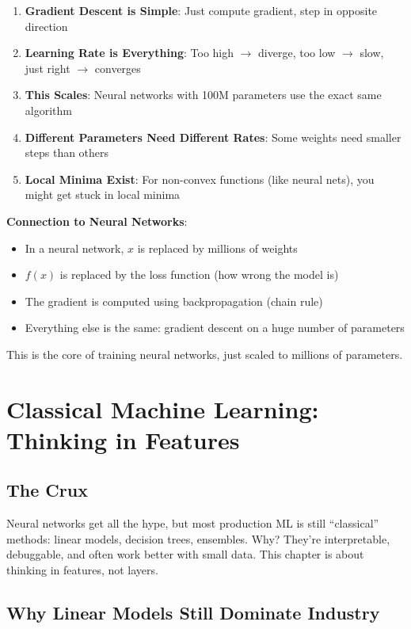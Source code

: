 \documentclass[11pt,oneside]{book}
\newcommand{\blankpage}{%
    \clearpage
    \thispagestyle{empty}
    \mbox{}
    \clearpage
}
\begin{document}
\begin{enumerate}
\item \textbf{Gradient Descent is Simple}: Just compute gradient, step in opposite direction
\item \textbf{Learning Rate is Everything}: Too high $\rightarrow$ diverge, too low $\rightarrow$ slow, just right $\rightarrow$ converges
\item \textbf{This Scales}: Neural networks with 100M parameters use the exact same algorithm
\item \textbf{Different Parameters Need Different Rates}: Some weights need smaller steps than others
\item \textbf{Local Minima Exist}: For non-convex functions (like neural nets), you might get stuck in local minima
\end{enumerate}

\textbf{Connection to Neural Networks}:
\begin{itemize}
\item In a neural network, $x$ is replaced by millions of weights
\item $f(x)$ is replaced by the loss function (how wrong the model is)
\item The gradient is computed using backpropagation (chain rule)
\item Everything else is the same: gradient descent on a huge number of parameters
\end{itemize}

This is the core of training neural networks, just scaled to millions of parameters.

\blankpage


\chapter{Classical Machine Learning: Thinking in Features}

\section{The Crux}
Neural networks get all the hype, but most production ML is still ``classical'' methods: linear models, decision trees, ensembles. Why? They're interpretable, debuggable, and often work better with small data. This chapter is about thinking in features, not layers.

\section{Why Linear Models Still Dominate Industry}
\end{document}

